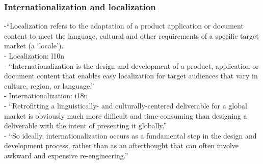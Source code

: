 \subsubsection{Internationalization and localization}
-{\color{orange}“Localization refers to the adaptation of a product application or document content to meet the language, cultural and other requirements of a specific target market (a ‘locale’).\cite{Ishida2005}}\\
-{\color{orange} Localization: l10n \cite{Ishida2005}}\\
-{\color{orange} “Internationalization is the design and development of a product, application or document content that enables easy localization for target audiences that vary in culture, region, or language.”\cite{Ishida2005}}\\
-{\color{orange} Internationalization: i18n\cite{Ishida2005}}\\
-{\color{orange} “Retrofitting a linguistically- and culturally-centered deliverable for a global market is obviously much more difficult and time-consuming than designing a deliverable with the intent of presenting it globally.”\cite{Ishida2005}}\\
-{\color{orange} “So ideally, internationalization occurs as a fundamental step in the design and development process, rather than as an afterthought that can often involve awkward and expensive re-engineering.”\cite{Ishida2005}}\\
